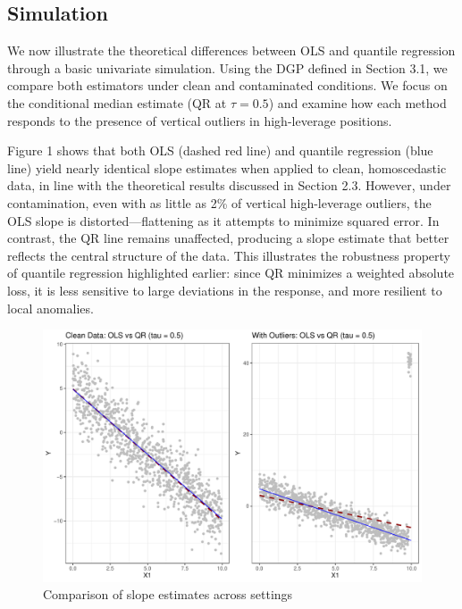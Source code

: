 \documentclass[fleqn,10pt]{latex/stylish_article} %
\begin{document}
\subsection{Simulation}\label{simulation}

We now illustrate the theoretical differences between OLS and quantile regression through a basic univariate simulation. Using the DGP defined in Section 3.1, we compare both estimators under clean and contaminated conditions. We focus on the conditional median estimate (QR at \(\tau = 0.5\)) and examine how each method responds to the presence of vertical outliers in high-leverage positions.

Figure 1 shows that both OLS (dashed red line) and quantile regression (blue line) yield nearly identical slope estimates when applied to clean, homoscedastic data, in line with the theoretical results discussed in Section 2.3. However, under contamination, even with as little as 2\% of vertical high-leverage outliers, the OLS slope is distorted---flattening as it attempts to minimize squared error. In contrast, the QR line remains unaffected, producing a slope estimate that better reflects the central structure of the data. This illustrates the robustness property of quantile regression highlighted earlier: since QR minimizes a weighted absolute loss, it is less sensitive to large deviations in the response, and more resilient to local anomalies.

\begin{figure}

{\centering \includegraphics[width=0.8\linewidth]{ADR_project_draft_files/figure-latex/unnamed-chunk-2-1} 

}

\caption{Comparison of slope estimates across settings}\label{fig:unnamed-chunk-2}
\end{figure}
\end{document}
